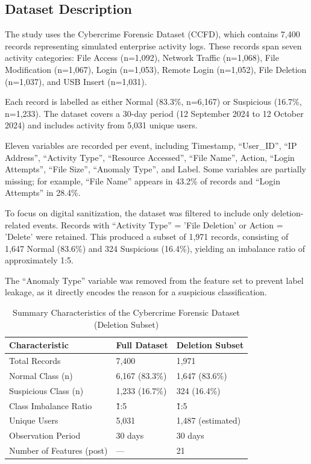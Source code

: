 \subsection{Dataset Description}
The study uses the Cybercrime Forensic Dataset (CCFD), which contains 7,400 records representing simulated enterprise activity logs. These records span seven activity categories: File Access (n=1,092), Network Traffic (n=1,068), File Modification (n=1,067), Login (n=1,053), Remote Login (n=1,052), File Deletion (n=1,037), and USB Insert (n=1,031).

Each record is labelled as either Normal (83.3\%, n=6,167) or Suspicious (16.7\%, n=1,233). The dataset covers a 30-day period (12 September 2024 to 12 October 2024) and includes activity from 5,031 unique users.

Eleven variables are recorded per event, including Timestamp, “User\_ID”, “IP Address”, “Activity Type”, “Resource Accessed”, “File Name”, Action, “Login Attempts”, “File Size”, “Anomaly Type”, and Label. Some variables are partially missing; for example, “File Name” appears in 43.2\% of records and “Login Attempts” in 28.4\%.

To focus on digital sanitization, the dataset was filtered to include only deletion-related events. Records with “Activity Type” = 'File Deletion' or Action = 'Delete' were retained. This produced a subset of 1,971 records, consisting of 1,647 Normal (83.6\%) and 324 Suspicious (16.4\%), yielding an imbalance ratio of approximately 1:5.

The “Anomaly Type” variable was removed from the feature set to prevent label leakage, as it directly encodes the reason for a suspicious classification.




\begin{table}
\centering
\caption{Summary Characteristics of the Cybercrime Forensic Dataset (Deletion Subset)}
\label{tab:delsub}

\begin{tabular}{| l | l | l |}
\hline
\textbf{Characteristic} & \textbf{Full Dataset} & \textbf{Deletion Subset} \\
\hline
Total Records & 7,400 & 1,971 \\
\hline
Normal Class (n) & 6,167 (83.3\%) & 1,647 (83.6\%) \\
\hline
Suspicious Class (n) & 1,233 (16.7\%) & 324 (16.4\%) \\
\hline
Class Imbalance Ratio & \~1:5 & \~1:5 \\
\hline
Unique Users & 5,031 & 1,487 (estimated) \\
\hline
Observation Period & 30 days & 30 days \\
\hline
Number of Features (post)& — & 21 \\
\hline

\end{tabular}

\end{table}



